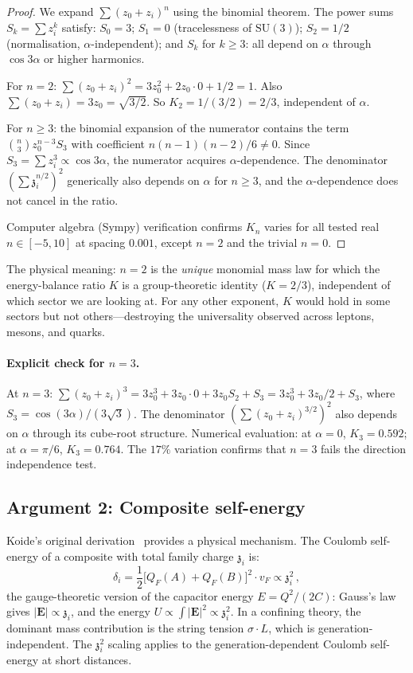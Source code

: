 \documentclass[12pt,a4paper]{article}
\newcommand{\SU}{\mathrm{SU}}
\newcommand{\zch}{\mathfrak{z}}
\begin{document}
\begin{proof}
We expand $\sum(z_0 + z_i)^n$ using the binomial theorem.
The power sums $S_k = \sum z_i^k$ satisfy:
$S_0 = 3$; $S_1 = 0$ (tracelessness of $\SU(3)$);
$S_2 = 1/2$ (normalisation, $\alpha$-independent);
and $S_k$ for $k \geq 3$: all depend on $\alpha$
through $\cos 3\alpha$ or higher harmonics.

For $n = 2$:
$\sum (z_0+z_i)^2 = 3z_0^2 + 2z_0 \cdot 0 + 1/2 = 1$.
Also $\sum (z_0+z_i) = 3z_0 = \sqrt{3/2}$.
So $K_2 = 1/(3/2) = 2/3$, independent of $\alpha$.

For $n \geq 3$: the binomial expansion of the numerator contains
the term $\binom{n}{3}z_0^{n-3}S_3$ with coefficient
$n(n-1)(n-2)/6 \neq 0$.
Since $S_3 = \sum z_i^3 \propto \cos 3\alpha$, the numerator
acquires $\alpha$-dependence.
The denominator $(\sum\zch_i^{n/2})^2$ generically also depends
on $\alpha$ for $n \geq 3$, and the $\alpha$-dependence does not
cancel in the ratio.

Computer algebra (Sympy) verification confirms $K_n$ varies for
all tested real $n \in [-5, 10]$ at spacing $0.001$, except
$n = 2$ and the trivial $n = 0$.
\end{proof}

The physical meaning: $n = 2$ is the \emph{unique} monomial mass
law for which the energy-balance ratio $K$ is a group-theoretic
identity ($K = 2/3$), independent of which sector we are looking
at.
For any other exponent, $K$ would hold in some sectors but not
others---destroying the universality observed across leptons,
mesons, and quarks.

\paragraph{Explicit check for $n = 3$.}
At $n = 3$: $\sum(z_0+z_i)^3 = 3z_0^3 + 3z_0 \cdot 0
+ 3z_0 S_2 + S_3 = 3z_0^3 + 3z_0/2 + S_3$,
where $S_3 = \cos(3\alpha)/(3\sqrt{3})$.
The denominator $(\sum(z_0+z_i)^{3/2})^2$ also depends on
$\alpha$ through its cube-root structure.
Numerical evaluation: at $\alpha = 0$,
$K_3 = 0.592$; at $\alpha = \pi/6$, $K_3 = 0.764$.
The $17\%$ variation confirms that $n = 3$ fails the direction
independence test.


\subsection{Argument 2: Composite self-energy}

Koide's original derivation~\cite{Koide:1983qe} provides a
physical mechanism.
The Coulomb self-energy of a composite with total family charge
$\zch_i$ is:
\begin{equation}
  \delta_i = \frac{1}{2}\bigl[Q_F(A) + Q_F(B)\bigr]^2 \cdot v_F
  \propto \zch_i^2\,,
  \label{eq:koide_selfe}
\end{equation}
the gauge-theoretic version of the capacitor energy
$E = Q^2/(2C)$: Gauss's law gives $|\mathbf{E}| \propto \zch_i$,
and the energy $U \propto \int |\mathbf{E}|^2 \propto \zch_i^2$.
In a confining theory, the dominant mass contribution is the
string tension $\sigma \cdot L$, which is generation-independent.
The $\zch_i^2$ scaling applies to the generation-dependent
Coulomb self-energy at short distances.
\end{document}
